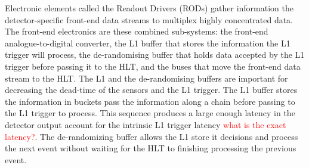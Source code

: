 Electronic elements called the Readout Drivers (RODs) gather information the detector-specific front-end data streams to multiplex highly concentrated data.  The front-end electronics are these combined sub-systems: the front-end analogue-to-digital converter, the L1 buffer that stores the information the L1 trigger will process, the de-randomising buffer that holds data accepted by the L1 trigger before passing it to the HLT, and the buses that move the front-end data stream to the HLT.  The L1 and the de-randomising buffers are important for decreasing the dead-time of the sensors and the L1 trigger.  The L1 buffer stores the information in buckets pass the information along a chain before passing to the L1 trigger to process.  This sequence produces a large enough latency in the detector output account for the intrinsic L1 trigger latency \textcolor{red}{what is the exact latency?}. The de-randomizing buffer allows the L1 store it decisions and process the next event without waiting for the HLT to finishing processing the previous event.
\fi


